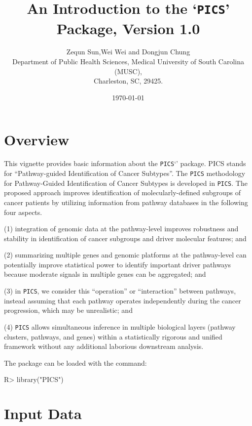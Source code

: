 \documentclass[11pt]{article}
\title{An Introduction to the `\texttt{PICS}' Package, Version 1.0}
\author{ Zequn Sun,Wei Wei and Dongjun Chung\\
Department of Public Health Sciences, Medical University of South Carolina (MUSC),\\
  Charleston, SC, 29425.}
\date{\today}
\begin{document}

\maketitle

\section{Overview}

This vignette provides basic information about the
\texttt{PICS}`\cite{PICS}' package. PICS stands for ``Pathway-guided Identification of Cancer Subtypes''.
The \texttt{PICS} methodology for Pathway-Guided Identification of Cancer Subtypes is developed in \texttt{PICS}. The proposed approach improves identification of molecularly-defined subgroups of cancer patients by utilizing information from pathway databases in the following four aspects.

(1) integration of genomic data at the pathway-level improves robustness and stability in identification of cancer subgroups and driver molecular features; and

(2) summarizing multiple genes and genomic platforms at the pathway-level can potentially improve statistical power to identify important driver pathways because moderate signals in multiple genes can be aggregated; and

(3) in \texttt{PICS}, we consider this ``operation'' or ``interaction'' between pathways, instead assuming that each pathway operates independently during the cancer progression, which may be unrealistic; and

(4) \texttt{PICS} allows simultaneous inference in multiple biological layers (pathway clusters, pathways, and genes) within a statistically rigorous and unified framework without any additional laborious downstream analysis.

The package can be loaded with the command:


\begin{Schunk}
\begin{Sinput}
R> library("PICS")
\end{Sinput}
\end{Schunk}

\section{Input Data}
\end{document}
